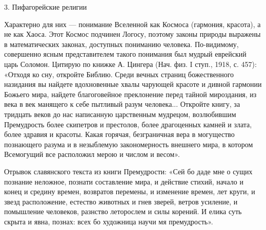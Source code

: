 3. Пифагорейские религии

Характерно для них --- понимание Вселенной как Космоса (гармония, красота), а не
как Хаоса. Этот Космос подчинен Логосу, поэтому законы природы выражены в
математических законах, доступных пониманию человека. По-видимому,
совершенно ясным представителем такого понимания был мудрый еврейский царь
Соломон. Цитирую по книжке А. Цингера (Нач. физ. I ступ., 1918, с. 457):
«Отходя ко сну, откройте Библию. Среди вечных страниц божественного
назидания вы найдете вдохновенные хвалы чарующей красоте и дивной гармонии
Божьего мира, найдете благоговейное преклонение перед тайной мироздания, из
века в век манящего к себе пытливый разум человека... Откройте книгу, за
тридцать веков до нас написанную царственным мудрецом, возлюбившим
Премудрость более скипетров и престолов, более драгоценных камней и злата,
более здравия и красоты. Какая горячая, безграничная вера в могущество
познающего разума и в незыблемую закономерность внешнего мира, в котором
Всемогущий все расположил мерою и числом и весом».

Отрывок славянского текста из книги Премудрости: «Сей бо даде мне о сущих
познание неложное, познати составление мира, и действие стихий, начало и
конец и средину времен, возвратов перемены, и изменение времен, лет круги, и
звезд расположение, естество животных и гнев зверей, ветров усиление, и
помышление человеков, разнство леторослем и силы корений. И елика суть
скрыта и явна, познах: всех бо художница научи мя премудрость».

